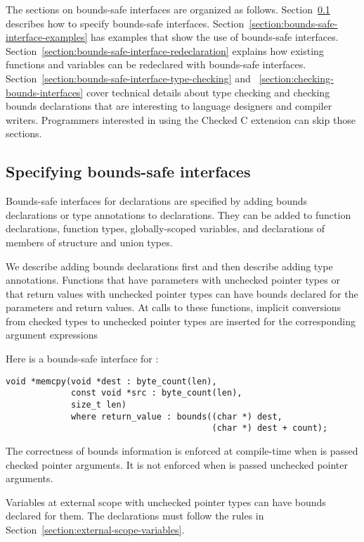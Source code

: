 The sections on bounds-safe interfaces are organized as
follows.  Section~\ref{section:bounds-safe-interface-specifying} describes
how to specify bounds-safe interfaces.
Section~\ref{section:bounds-safe-interface-examples}
has examples that show the use of bounds-safe interfaces.
Section~\ref{section:bounds-safe-interface-redeclaration} explains
how existing functions and variables can be redeclared with bounds-safe
interfaces.  Section~\ref{section:bounds-safe-interface-type-checking}
and ~\ref{section:checking-bounds-interfaces} cover technical details
about type checking and checking bounds declarations that are interesting
to language designers and compiler writers.  Programmers interested
in using the Checked C extension can skip those sections.

\subsection{Specifying bounds-safe interfaces}
\label{section:bounds-safe-interface-specifying}
Bounds-safe interfaces for declarations are specified by adding bounds
declarations or type annotations to declarations.  They can be added to
function declarations, function types, globally-scoped variables, and
declarations of members of structure and union types.

We describe adding bounds declarations first and then  describe adding type
annotations.  Functions that have parameters with unchecked pointer
types or that return values with unchecked pointer types can have bounds
declared for the parameters and return values.  At calls to
these functions, implicit conversions from checked types to unchecked
pointer types are inserted for the corresponding argument expressions
  
Here is a bounds-safe interface for :
\begin{lstlisting}
void *memcpy(void *dest : byte_count(len),
             const void *src : byte_count(len), 
             size_t len) 
             where return_value : bounds((char *) dest,
                                         (char *) dest + count);
\end{lstlisting}
The correctness of bounds information is enforced at compile-time when
 is passed checked pointer arguments. It is not enforced when 
 is passed unchecked pointer arguments.

Variables at external scope with unchecked pointer types can have
bounds declared for them.   The declarations must follow the 
rules in Section~\ref{section:external-scope-variables}.


